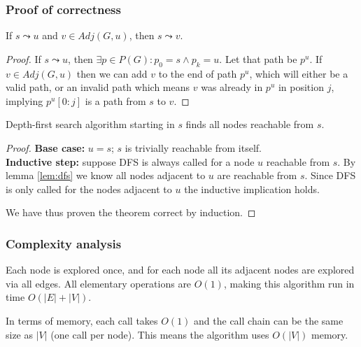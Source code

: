 \subsubsection{Proof of correctness}
\begin{lemma} \label{lem:dfs}
    If $s \leadsto u$ and $v \in Adj(G, u)$, then $s \leadsto v$.
\end{lemma}
\begin{proof}
    If $s \leadsto u$, then $\exists p \in P(G) \colon p_0 = s \wedge p_k = u$. Let that path be $p^u$. If $v \in Adj(G, u)$ then we can add $v$ to the end of path $p^u$, which will either be a valid path, or an invalid path which means $v$ was already in $p^u$ in position $j$, implying $p^u[0:j]$ is a path from $s$ to $v$.
\end{proof}
\begin{theorem}
    Depth-first search algorithm starting in $s$ finds all nodes reachable from $s$.
\end{theorem}
\begin{proof} \textbf{Base case:} $u=s$; $s$ is trivially reachable from itself. \\
\textbf{Inductive step:} suppose \textsc{DFS} is always called for a node $u$ reachable from $s$. By lemma \ref{lem:dfs} we know all nodes adjacent to $u$ are reachable from $s$. Since \textsc{DFS} is only called for the nodes adjacent to $u$ the inductive implication holds.\par
We have thus proven the theorem correct by induction.
\end{proof}
\subsubsection{Complexity analysis}
Each node is explored once, and for each node all its adjacent nodes are explored via all edges. All elementary operations are $O(1)$, making this algorithm run in time $O(|E|+|V|)$.\par
In terms of memory, each call takes $O(1)$ and the call chain can be the same size as $|V|$ (one call per node). This means the algorithm uses $O(|V|)$ memory.

